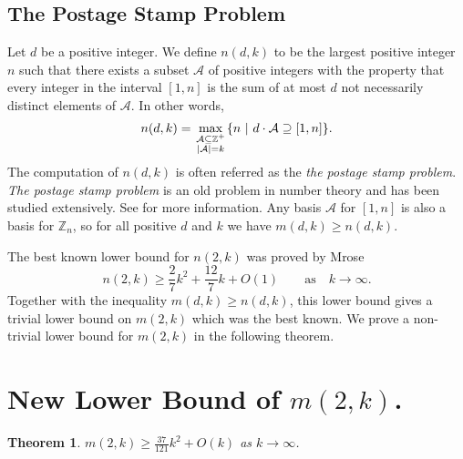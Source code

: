 \documentclass[11pt]{article}
\newtheorem{theorem}{Theorem}[section]
\theoremstyle{definition}
\def\Z{\mbox{$\mathbb Z$}}
\begin{document}
\subsection{The Postage Stamp Problem}
 Let $d$ be a positive integer. We define $n(d, k)$ to be the largest positive integer $n$ such that there exists a subset $\mathcal{A}$ of positive integers with the property that every integer in the interval $[1, n]$ is the sum of at most $d$ not necessarily distinct elements of $\mathcal{A}$. In other words, 
\[
n(d, k) = \max_{\scriptstyle \mathcal{A}\subseteq\mathbb Z^{+}\atop\scriptstyle |\mathcal{A}|=k}\{n\  |\ d\cdot \mathcal{A}\supseteq[1, n]\}.
\]
The computation of  $n(d, k)$ is often referred as the \emph{the postage stamp problem}. \emph{The postage stamp problem} is an old problem in number theory and has been studied extensively. See  for more information. Any basis $\mathcal{A}$ for $[1, n]$ is also a basis for $\Z_n$, so for all positive $d$ and $k$ we have $m(d, k) \geq n(d, k)$.

The  best known lower bound for $n(2,k)$ was proved by Mrose \cite{Mrose1979}
\[
n(2, k) \geq \frac{2}{7}k^2 + \frac{12}{7}k + O(1)\qquad  \text{as}\quad  k \to \infty.
\]
Together with the inequality $m(d, k) \geq n(d, k)$, this lower bound gives a trivial lower bound on $m(2, k)$ which was the best known. We prove a non-trivial lower bound for $m(2,k)$ in the following theorem.
 
\section{New Lower Bound of $m(2, k)$.}
 
 
\begin{theorem}
$\displaystyle m(2,k) \geq \frac{37}{121}k^2 + O(k)$  as $ k \to \infty$.
\end{theorem}
\end{document}
